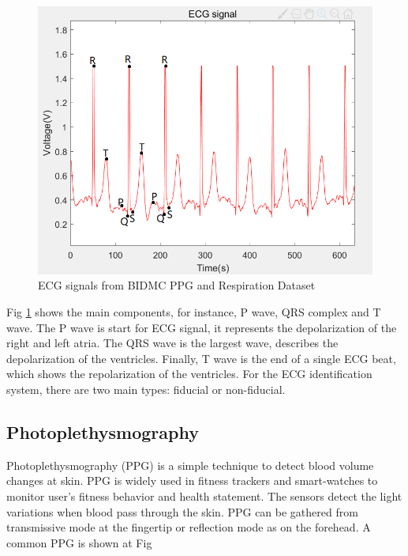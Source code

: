 \documentclass[a4paper,12pt]{article}
\begin{document}
\begin{figure}[H]
\centering
\includegraphics[width = .8\textwidth]{ecg.PNG}
\caption{ECG signals from BIDMC PPG and Respiration Dataset\autocite{PhysioNet}}
\label{fig:ecg}
\end{figure}

Fig \ref{fig:ecg} shows the main components, for instance, P wave, QRS complex and T wave. The P wave is start for ECG signal, it represents the depolarization of the right and left atria\parencite{Agrafioti:2011heart}. The QRS wave is the largest wave, describes the depolarization of the ventricles\parencite{Wiki:ecg}. Finally, T wave is the end of a single ECG beat, which shows the repolarization of the ventricles\parencite{Lilly:2012pathophysiology}. For the ECG identification system, there are two main types: fiducial or non-fiducial\parencite{Agrafioti:2012secure}. 

\subsection{Photoplethysmography}
Photoplethysmography (PPG) is a simple technique to detect blood volume changes at skin\parencite{Karimian:2017human}. PPG is widely used in fitness trackers and smart-watches to monitor user's fitness behavior and health statement. The sensors detect the light variations when blood pass through the skin\parencite{Blasco:2018feasibility}. PPG can be gathered from transmissive mode at the fingertip or reflection mode as on the forehead\parencite{wiki:ppg}. A common PPG is shown at Fig
\end{document}
